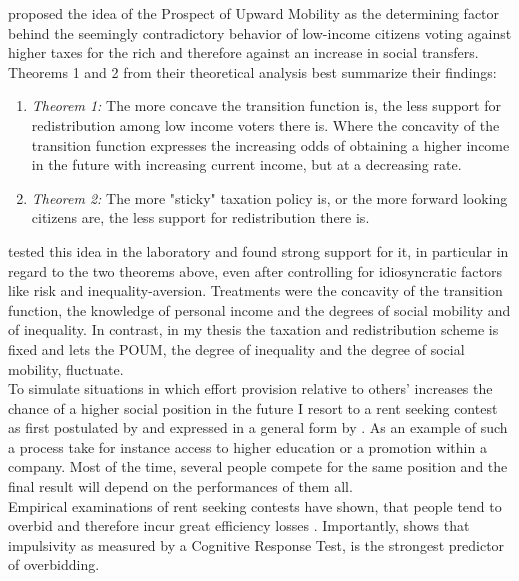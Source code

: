 \cite{ok2000} proposed the idea of the Prospect of Upward Mobility as the determining factor behind the seemingly contradictory behavior of low-income citizens voting against higher taxes for the rich and therefore against an increase in social transfers.\\
Theorems 1 and 2 from their theoretical analysis best summarize their findings:
\begin{enumerate}
    \item \textit{Theorem 1:} The more concave the transition function is, the less support for redistribution among low income voters there is. Where the concavity of the transition function expresses the increasing odds of obtaining a higher income in the future with increasing current income, but at a decreasing rate.  
    \item \textit{Theorem 2:} The more "sticky" taxation policy is, or the more forward looking citizens are, the less support for redistribution there is.
\end{enumerate}

\cite{checchi2003} tested this idea in the laboratory and found strong support for it, in particular in regard to the two theorems above, even after controlling for idiosyncratic factors like risk and inequality-aversion. Treatments were the concavity of the transition function, the knowledge of personal income and the degrees of social mobility and of inequality. In contrast, in my thesis the taxation and redistribution scheme is fixed and lets the POUM, the degree of inequality and the degree of social mobility, fluctuate.\\

To simulate situations in which effort provision relative to others' increases the chance of a higher social position in the future I resort to a rent seeking contest as first postulated by \cite{tullock1980} and expressed in a general form by \cite{sheremeta2010a}. As an example of such a process take for instance access to higher education or a promotion within a company. Most of the time, several people compete for the same position and the final result will depend on the performances of them all.\\
Empirical examinations of rent seeking contests have shown, that people tend to overbid and therefore incur great efficiency losses \citep{sheremeta2016, chowdhury2014, konrad2009, dechenaux2015}. Importantly, \cite{sheremeta2016} shows that impulsivity as measured by a Cognitive Response Test, is the strongest predictor of overbidding.\\